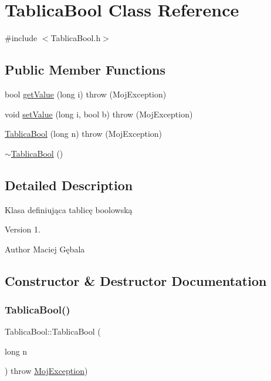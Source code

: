 \hypertarget{class_tablica_bool}{}\section{Tablica\+Bool Class Reference}
\label{class_tablica_bool}


{\ttfamily \#include $<$Tablica\+Bool.\+h$>$}

\subsection*{Public Member Functions}
\begin{DoxyCompactItemize}
\item 
bool \mbox{\hyperlink{class_tablica_bool_af84af9cb90889428f629736eb7a01ca2}{get\+Value}} (long i)  throw (\+Moj\+Exception)
\item 
void \mbox{\hyperlink{class_tablica_bool_a10ca9f3b3a983162934b4f3e277c7a74}{set\+Value}} (long i, bool b)  throw (\+Moj\+Exception)
\item 
\mbox{\hyperlink{class_tablica_bool_af88f39de7ae4836158c44c6d9931955e}{Tablica\+Bool}} (long n)  throw (\+Moj\+Exception)
\item 
\mbox{\hyperlink{class_tablica_bool_a9b19caafe772bab056c6405d76e7d155}{$\sim$\+Tablica\+Bool}} ()
\end{DoxyCompactItemize}


\subsection{Detailed Description}
Klasa definiująca tablicę boolowską \begin{DoxyVersion}{Version}
1. 
\end{DoxyVersion}
\begin{DoxyAuthor}{Author}
Maciej Gębala 
\end{DoxyAuthor}


\subsection{Constructor \& Destructor Documentation}
\mbox{\label{class_tablica_bool_af88f39de7ae4836158c44c6d9931955e}} 
\subsubsection{\texorpdfstring{Tablica\+Bool()}{TablicaBool()}}
{\footnotesize\ttfamily Tablica\+Bool\+::\+Tablica\+Bool (\begin{DoxyParamCaption}\item[{long}]{n }\end{DoxyParamCaption}) throw  \mbox{\hyperlink{class_moj_exception}{Moj\+Exception}}) }

